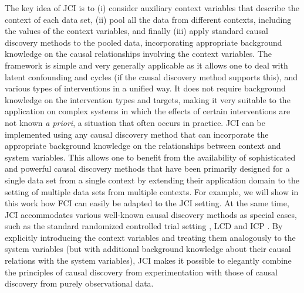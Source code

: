 \documentclass[twoside,11pt]{article}
\newcommand{\Joris}[1]{{\color{blue}#1}}
\newcommand{\Tom}[1] {{\color{green}#1}}
\begin{document}
The key idea of JCI is to (i) consider auxiliary context variables that describe the context of each data set, (ii) pool all the data from different contexts, including the values of the context variables, and finally (iii) apply standard
causal discovery methods to the pooled data, incorporating appropriate background knowledge on the
causal relationships involving the context variables. The framework is simple and very generally 
applicable as it allows
one to deal with latent confounding and cycles (if the causal discovery method supports this), 
and various types of interventions in a unified way.
It does not require background knowledge on the intervention types and targets, making it very
suitable to the application on complex systems in which the effects of certain interventions are
not known \emph{a priori}, a situation that often occurs in practice.
JCI can be implemented using any causal discovery method that can incorporate the appropriate
background knowledge on the relationships between context and system variables. 
This allows one to benefit from the availability of sophisticated 
and powerful causal discovery methods that have been primarily designed for a single data set 
from a single context by extending their application domain to the setting of multiple data sets 
from multiple contexts. For example, we will show in this work how FCI \citep{SMR1999,Zhang2008_AI} can easily be adapted to the
JCI setting. At the same time, JCI accommodates various well-known causal discovery
methods as special cases, such as the standard randomized controlled trial setting \citep{Fisher1935}, LCD \citep{Cooper1997}
and ICP \citep{ICP2016}.
By explicitly introducing the context variables and treating them analogously to the system 
variables (but with additional background knowledge about their causal relations with the system variables), JCI makes
it possible to elegantly combine the principles of 
causal discovery from experimentation with those of causal discovery from purely observational data.
\end{document}
